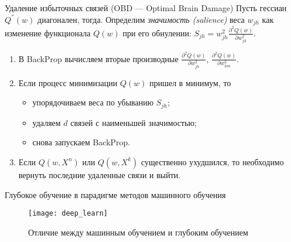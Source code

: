 \documentclass[11pt]{beamer}
\begin{document}
	\begin{frame}{Удаление избыточных связей (OBD --- Optimal Brain Damage)}
		Пусть гессиан $Q^{''}(w)$ диагонален, тогда. Определим \textit{значимость (salience)} веса $w_{jh}$ как изменение функционала $Q(w)$ при его обнулении: $S_{jh} = w^2_{jh}  \frac{\partial^2 Q(w) }{\partial w_{jh}^2 } $. 
		\begin{enumerate}
			\item В BackProp вычисляем вторые производные $\frac{\partial^2 Q(w) }{\partial w_{jh}^2 } $,  $\frac{\partial^2 Q(w) }{\partial w_{hm}^2 } $.
			\item Если процесс минимизации $Q(w)$ пришел в минимум, то
			\begin{itemize}
				\item упорядочиваем веса по убыванию $S_{jh}$;
				\item удаляем $d$ связей с наименьшей значимостью;
				\item снова запускаем BackProp.
			\end{itemize}
			\item Если $Q(w, X^n)$ или $Q(w, X^k)$ существенно ухудшился, то необходимо вернуть последние удаленные связи и выйти.
		\end{enumerate}
	\end{frame}

	\begin{frame}{Глубокое обучение в парадигме методов машинного обучения}
		\begin{figure}[H]
			\begin{center}
				\texttt{[image: deep\_learn]}
			\end{center}
			\caption{Отличие между машинным обучением и глубоким обучением}
		\end{figure}
	\end{frame}
\end{document}
